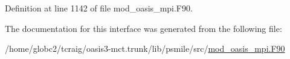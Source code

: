 Definition at line 1142 of file mod\+\_\+oasis\+\_\+mpi.\+F90.



The documentation for this interface was generated from the following file\+:\begin{DoxyCompactItemize}
\item 
/home/globc2/tcraig/oasis3-\/mct.\+trunk/lib/psmile/src/\hyperlink{mod__oasis__mpi_8_f90}{mod\+\_\+oasis\+\_\+mpi.\+F90}\end{DoxyCompactItemize}
